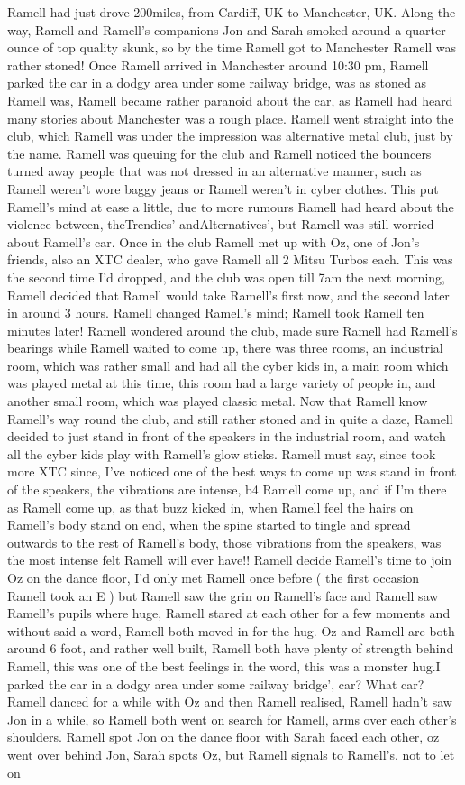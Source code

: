 \documentclass[12pt]{book}
\begin{document}
Ramell had just drove 200miles, from Cardiff, UK to Manchester, UK. Along the way, Ramell and Ramell's companions Jon and Sarah smoked around a quarter ounce of top quality skunk, so by the time Ramell got to Manchester Ramell was rather stoned! Once Ramell arrived in Manchester around 10:30 pm, Ramell parked the car in a dodgy area under some railway bridge, was as stoned as Ramell was, Ramell became rather paranoid about the car, as Ramell had heard many stories about Manchester was a rough place. Ramell went straight into the club, which Ramell was under the impression was alternative metal club, just by the name. Ramell was queuing for the club and Ramell noticed the bouncers turned away people that was not dressed in an alternative manner, such as Ramell weren't wore baggy jeans or Ramell weren't in cyber clothes. This put Ramell's mind at ease a little, due to more rumours Ramell had heard about the violence between, theTrendies' andAlternatives', but Ramell was still worried about Ramell's car. Once in the club Ramell met up with Oz, one of Jon's friends, also an XTC dealer, who gave Ramell all 2 Mitsu Turbos each. This was the second time I'd dropped, and the club was open till 7am the next morning, Ramell decided that Ramell would take Ramell's first now, and the second later in around 3 hours. Ramell changed Ramell's mind; Ramell took Ramell ten minutes later! Ramell wondered around the club, made sure Ramell had Ramell's bearings while Ramell waited to come up, there was three rooms, an industrial room, which was rather small and had all the cyber kids in, a main room which was played metal at this time, this room had a large variety of people in, and another small room, which was played classic metal. Now that Ramell know Ramell's way round the club, and still rather stoned and in quite a daze, Ramell decided to just stand in front of the speakers in the industrial room, and watch all the cyber kids play with Ramell's glow sticks. Ramell must say, since took more XTC since, I've noticed one of the best ways to come up was stand in front of the speakers, the vibrations are intense, b4 Ramell come up, and if I'm there as Ramell come up, as that buzz kicked in, when Ramell feel the hairs on Ramell's body stand on end, when the spine started to tingle and spread outwards to the rest of Ramell's body, those vibrations from the speakers, was the most intense felt Ramell will ever have!! Ramell decide Ramell's time to join Oz on the dance floor, I'd only met Ramell once before ( the first occasion Ramell took an E ) but Ramell saw the grin on Ramell's face and Ramell saw Ramell's pupils where huge, Ramell stared at each other for a few moments and without said a word, Ramell both moved in for the hug. Oz and Ramell are both around 6 foot, and rather well built, Ramell both have plenty of strength behind Ramell, this was one of the best feelings in the word, this was a monster hug.I parked the car in a dodgy area under some railway bridge', car? What car? Ramell danced for a while with Oz and then Ramell realised, Ramell hadn't saw Jon in a while, so Ramell both went on search for Ramell, arms over each other's shoulders. Ramell spot Jon on the dance floor with Sarah faced each other, oz went over behind Jon, Sarah spots Oz, but Ramell signals to Ramell's, not to let on 
\end{document}
